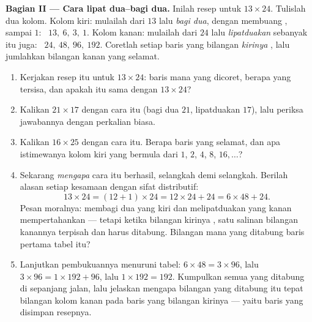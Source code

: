 \begin{problem}
\medskip
\noindent\textbf{Bagian II --- Cara lipat dua--bagi dua.}
Inilah resep untuk $13 \times 24$. Tulislah dua kolom. Kolom kiri:
mulailah dari $13$ lalu \emph{bagi dua}, dengan membuang ,
sampai $1$: \ $13,\ 6,\ 3,\ 1$. Kolom kanan: mulailah dari $24$ lalu
\emph{lipatduakan} sebanyak itu juga: \ $24,\ 48,\ 96,\ 192$. Coretlah
setiap baris yang bilangan \emph{kirinya} , lalu jumlahkan
bilangan kanan yang selamat.
\begin{enumerate}[resume]
  \item Kerjakan resep itu untuk $13 \times 24$: baris mana yang
        dicoret,  berapa yang tersisa, dan apakah  itu
        sama dengan $13 \times 24$?
  \item Kalikan $21 \times 17$ dengan cara itu (bagi dua $21$,
        lipatduakan $17$), lalu periksa jawabannya dengan perkalian
        biasa.
  \item Kalikan $16 \times 25$ dengan cara itu. Berapa baris yang
        selamat, dan apa istimewanya kolom kiri yang bermula dari $1$,
        $2$, $4$, $8$, $16, \dots$?
  \item Sekarang \emph{mengapa} cara itu berhasil, selangkah demi
        selangkah. Berilah alasan setiap kesamaan dengan sifat
        distributif:
        \[
        13 \times 24 = (12 + 1) \times 24
        = 12 \times 24 + 24 = 6 \times 48 + 24 .
        \]
        Pesan moralnya: membagi dua yang kiri dan melipatduakan yang
        kanan mempertahankan  --- tetapi ketika bilangan
        kirinya \emph{}, satu salinan bilangan kanannya
        terpisah dan harus ditabung. Bilangan mana yang ditabung
        baris pertama tabel itu?
  \item Lanjutkan pembukuannya menuruni tabel:
        $6 \times 48 = 3 \times 96$, lalu
        $3 \times 96 = 1 \times 192 + 96$, lalu
        $1 \times 192 = 192$. Kumpulkan semua yang ditabung di
        sepanjang jalan, lalu jelaskan mengapa bilangan yang ditabung
        itu tepat bilangan kolom kanan pada baris yang bilangan
        kirinya  --- yaitu baris yang disimpan resepnya.
\end{enumerate}


\end{problem}
